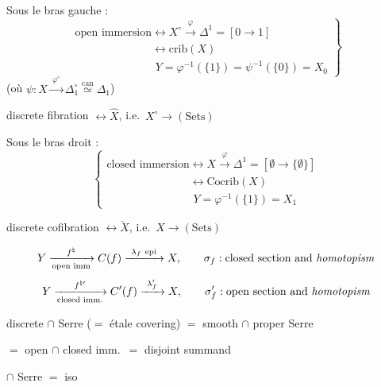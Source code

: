 \documentclass[11pt,a4paper]{article}
\begin{document}
Sous le bras gauche :
\[
  \left.\begin{array}{l}
    \text{open immersion} \longleftrightarrow X^{\circ} \xrightarrow{\ \varphi\ } \Delta^1 = [0 \to 1] \\
    \phantom{\text{open immersion}} \longleftrightarrow \mathrm{crib}(X) \\
    \phantom{\text{open immersion \ }} Y = \varphi^{-1}(\{1\}) = \psi^{-1}(\{0\}) = X_0
  \end{array}\right\}
\]
(où $\psi : X \xrightarrow{\ \varphi^{\circ}\ } \Delta_1^{\circ} \overset{\mathrm{can}}{\simeq} \Delta_1$)

discrete fibration $\longleftrightarrow \hat{X}$, i.e.\ $X^{\circ} \to (\mathrm{Sets})$

Sous le bras droit :
\[
  \left\{\begin{array}{l}
    \text{closed immersion} \longleftrightarrow X \xrightarrow{\ \varphi\ } \Delta^1 = [\emptyset \to \{\emptyset\}] \\
    \phantom{\text{closed immersion}} \longleftrightarrow \mathrm{Cocrib}(X) \\
    \phantom{\text{closed immersion \ }} Y = \varphi^{-1}(\{1\}) = X_1
  \end{array}\right.
\]

discrete cofibration $\longleftrightarrow \check{X}$, i.e.\ $X \to (\mathrm{Sets})$

\[
  Y \xrightarrow[\text{open imm}]{\ f^{\natural}\ } C(f) \xrightarrow{\ \lambda_f\ \text{epi}\ } X,
  \qquad \sigma_f : \text{closed section and \textit{homotopism}}
\]
\[
  Y \xrightarrow[\text{closed imm.}]{\ f^{\natural\prime}\ } C'(f) \xrightarrow{\ \lambda'_f\ } X,
  \qquad \sigma'_f : \text{open section and \textit{homotopism}}
\]


discrete $\cap$ Serre ($=$ étale covering) $=$ smooth $\cap$ proper \struck{\ill{}} Serre

 $=$ open $\cap$ closed imm.\ $=$ disjoint summand

 $\cap$ \struck{\ill{}} Serre $=$ iso
\end{document}
